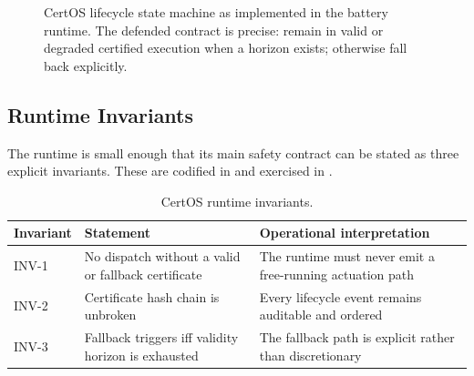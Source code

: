 \begin{figure}[ht]
\centering
{}
\caption{CertOS lifecycle state machine as implemented in the battery runtime.
The defended contract is precise: remain in valid or degraded certified
execution when a horizon exists; otherwise fall back explicitly.}
\label{fig:certos-lifecycle}
\end{figure}

\subsection{Runtime Invariants}

The runtime is small enough that its main safety contract can be stated as
three explicit invariants.  These are codified in
 and exercised in
.

\begin{table}[ht]
\centering
\caption{CertOS runtime invariants.}
\label{tab:certos-invariants}
\begin{tabular}{p{1.6cm}p{4.0cm}p{5.4cm}}
\toprule
\textbf{Invariant} & \textbf{Statement} & \textbf{Operational interpretation} \\
\midrule
INV-1 & No dispatch without a valid or fallback certificate & The runtime must never emit a free-running actuation path \\
INV-2 & Certificate hash chain is unbroken & Every lifecycle event remains auditable and ordered \\
INV-3 & Fallback triggers iff validity horizon is exhausted & The fallback path is explicit rather than discretionary \\
\bottomrule
\end{tabular}
\end{table}

